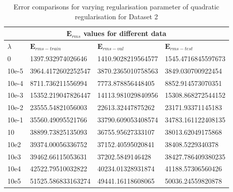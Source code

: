 {
\begin{table}[hptb]
\begin{tabular}{ |p{1.5cm}|p{3cm}|p{3cm}| p{3cm}|  }
\hline
\multicolumn{4}{|c|}{$\mathbf{E}_{rms}$ values for different data } \\
\hline
\rowcolor{lightgray}\textbf{$\lambda$} & $\mathbf{E}_{rms-train}$ & $\mathbf{E}_{rms-val}$ & $\mathbf{E}_{rms-test}$ \\
\hline
  0      &   1397.932974026646    &       1410.9028219564577       &     1545.4716845597673   \\
 \hline
  10e-5  &   3964.4172602252547    &       3870.2365010758563        &     3849.030700922454   \\   
 \hline
  10e-4  &  8711.736211556994       &       7773.878856448405        &     8852.914573070351        \\
 \hline
  10e-3  &   15352.219047826447      &       14113.981029840956       &     15308.868272544152     \\
 \hline
  10e-2  &   23555.54821056003      &       22613.32447875262       &     23171.93371145183    \\
 \hline
  10e-1  &   35560.49095521766     &       33790.609053408574        &     34783.161122408135      \\
  \hline
  10     &   38899.73825135093    &        36755.95627333107         &     38013.62049175868      \\
  \hline
  10e2   &   39374.00056336752    &         37152.40595020841       &      38408.5229340378        \\
  \hline
  10e3   &   39462.66115053631   &        37202.5849146428         &       38427.786409380235      \\
  \hline
  10e4   &   42522.79510032822   &         40234.01328931874       &        41188.57306560426      \\
  \hline
  10e5  &    51525.586833163274  &         49441.16118608065       &        50036.24559820878      \\
\hline
\end{tabular}
\caption{Error comparisons for varying regularisation parameter of quadratic regularisation for Dataset 2}
\label{table:10}
\end{table}
}

